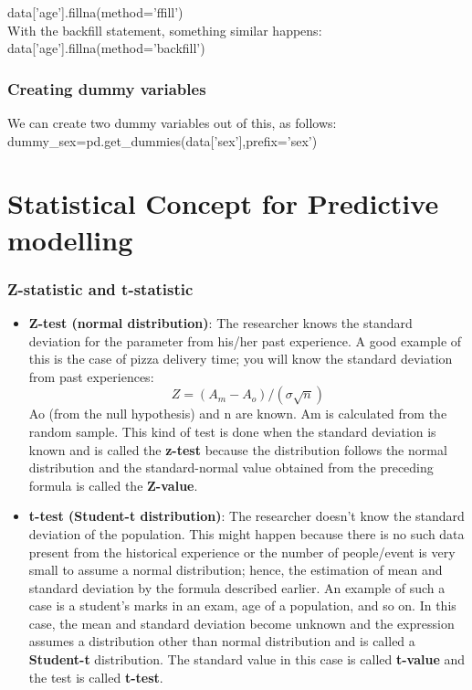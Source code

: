 \documentclass{article}
\numberwithin{equation}{section} %
\begin{document}
data['age'].fillna(method='ffill') \\

With the backfill statement, something similar happens: \\

data['age'].fillna(method='backfill') \\


\subsubsection*{Creating dummy variables}

We can create two dummy variables out of this, as follows: \\

dummy\_sex=pd.get\_dummies(data['sex'],prefix='sex')



\newpage

\section*{Statistical Concept for Predictive modelling}

\subsubsection*{Z-statistic and t-statistic}

\begin{itemize}
	\item  \textbf{Z-test (normal distribution)}: The researcher knows the standard deviation for the parameter from his/her past experience. A good example of this is the case of pizza delivery time; you will know the standard deviation from past experiences:
	\begin{equation*}
	Z = (A_m - A_o)/(\sigma\sqrt{n})
	\end{equation*}
	Ao (from the null hypothesis) and n are known. Am is calculated from the
	random sample. This kind of test is done when the standard deviation is
	known and is called the \textbf{z-test} because the distribution follows the normal distribution and the standard-normal value obtained from the preceding
	formula is called the \textbf{Z-value}.
	
	\item \textbf{t-test (Student-t distribution)}: The researcher doesn't know the standard deviation of the population. This might happen because there is no such data present from the historical experience or the number of people/event is very small to assume a normal distribution; hence, the estimation of mean and
	standard deviation by the formula described earlier. An example of such a
	case is a student's marks in an exam, age of a population, and so on. In this
	case, the mean and standard deviation become unknown and the expression
	assumes a distribution other than normal distribution and is called a
	\textbf{Student-t} distribution. The standard value in this case is called \textbf{t-value} and the test is called \textbf{t-test}.
\end{itemize}
\end{document}
